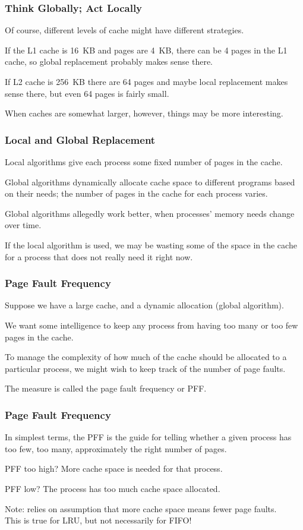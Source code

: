 \begin{frame}
\frametitle{Think Globally; Act Locally}

Of course, different levels of cache might have different strategies. 

If the L1 cache is 16~KB and pages are 4~KB, there can be 4 pages in the L1 cache, so global replacement probably makes sense there. 

If L2 cache is 256~KB there are 64 pages and maybe local replacement makes sense there, but even 64 pages is fairly small.

When caches are somewhat larger, however, things may be more interesting.

\end{frame}


\begin{frame}
\frametitle{Local and Global Replacement}

Local algorithms give each process some fixed number of pages in the cache. 

Global algorithms dynamically allocate cache space to different programs based on their needs; the number of pages in the cache for each process varies.

Global algorithms allegedly work better, when processes' memory needs change over time.

If the local algorithm is used, we may be wasting some of the space in the cache for a process that does not really need it right now. 

\end{frame}

\begin{frame}
\frametitle{Page Fault Frequency}

Suppose we have a large cache, and a dynamic allocation (global algorithm).

We want some intelligence to keep any process from having too many or too few pages in the cache. 

To manage the complexity of how much of the cache should be allocated to a particular process, we might wish to keep track of the number of page faults.

The measure is called the \alert{page fault frequency} or PFF. 


\end{frame}

\begin{frame}
\frametitle{Page Fault Frequency}

In simplest terms, the PFF is the guide for telling whether a given process has too few, too many, approximately the right number of pages. 

PFF too high? More cache space is needed for that process. 

PFF low? The process has too much cache space allocated.

Note: relies on assumption that more cache space means fewer page faults.\\
\quad This is true for LRU, but not necessarily for FIFO!

\end{frame}



